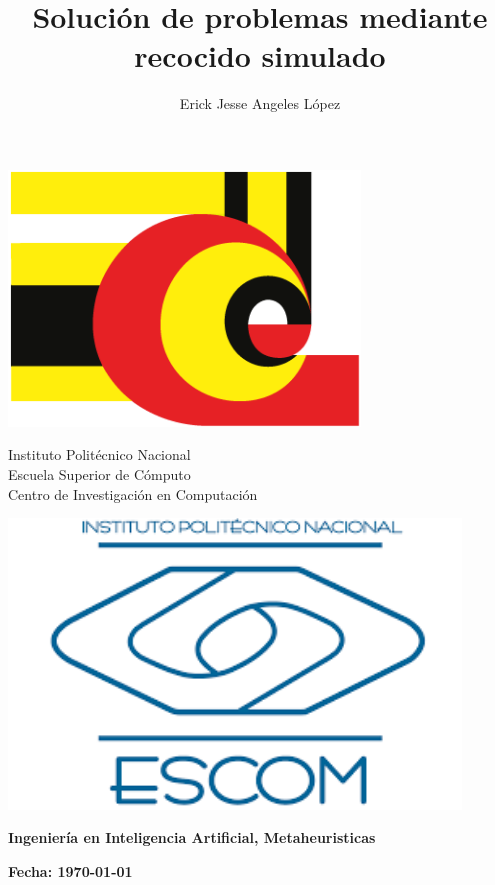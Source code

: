 \documentclass[12pt,twoside]{report}
\title{Solución de problemas mediante recocido simulado}
\author{Erick Jesse Angeles López}
\date{}
\begin{document}
	
	\begin{center}
		
		\begin{minipage}{0.17\textwidth}
			\centering
			\includegraphics[width=0.7\textwidth]{img/cic_logo.png} %
		\end{minipage}
		\begin{minipage}{.55\textwidth}
			\centering
			{\Large Instituto Politécnico Nacional}\\
			{\Large Escuela Superior de Cómputo}\\
			{\Large Centro de Investigación en Computación}
		\end{minipage}
		\begin{minipage}{0.17\textwidth}
			\centering
			\includegraphics[width=0.9\textwidth]{img/escom_logo} %
		\end{minipage}			
	\end{center}
	
	
	\centerline{\bf Ingeniería en Inteligencia Artificial, Metaheuristicas}
	
	\centerline{\bf Fecha: \today}
	
\end{document}
